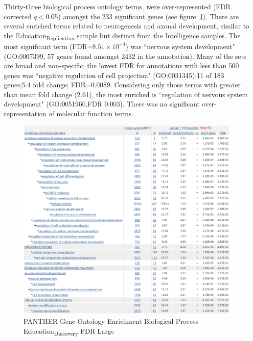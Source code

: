     Thirty-three biological process ontology terms, were over-represented (FDR corrected $q<$0.05) amongst the 233 significant genes (see figure~\ref{fig:panther bp ukbb edu fdr}). There are several enriched terms related to neurogenesis and axonal development, similar to the Education\textsubscript{Replication} sample but distinct from the Intelligence samples. The most significant term (FDR=$8.51\times10^{-4}$) was ``nervous system development" (GO:0007399, 57 genes found amongst 2432 in the annotation). Many of the sets are broad and non-specific; the lowest FDR for annotations with less than 500 genes was ``negative regulation of cell projection" (GO:0031345);11 of 183 genes;5.4 fold change; FDR=0.0089.  Considering only those terms with greater than mean fold change (2.61), the most enriched is ``regulation of nervous system development" (GO:0051960,FDR 0.003). There was no significant over-representation of molecular function terms. 
    
    \begin{figure}
                \centering
                \includegraphics[width=\textwidth]{images/chapter2/large_screenshots/edu_discovery_bp_allbg_panther.png}
                \caption{PANTHER Gene Ontology Enrichment Biological Process Education\textsubscript{Discovery} FDR Large}
                \label{fig:panther bp ukbb edu fdr}
            \end{figure}
            
